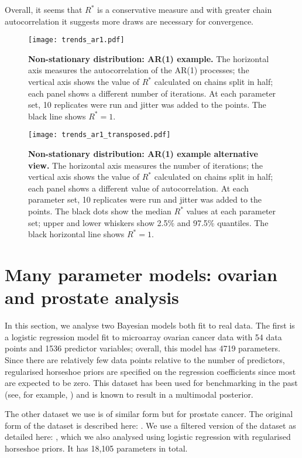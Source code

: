 \documentclass{article}
\begin{document}
Overall, it seems that $R^*$ is a conservative measure and with greater chain autocorrelation it suggests more draws are necessary for convergence.

\begin{figure}[!htb]
	\centerline{\texttt{[image: trends\_ar1.pdf]}}
	\caption{\textbf{Non-stationary distribution: AR(1) example.} The horizontal axis measures the autocorrelation of the AR(1) processes; the vertical axis shows the value of $R^*$ calculated on chains split in half; each panel shows a different number of iterations. At each parameter set, 10 replicates were run and jitter was added to the points. The black line shows $R^*=1$.}
	\label{fig:trends_ar1}
\end{figure}

\begin{figure}[!htb]
	\centerline{\texttt{[image: trends\_ar1\_transposed.pdf]}}
	\caption{\textbf{Non-stationary distribution: AR(1) example alternative view.} The horizontal axis measures the number of iterations; the vertical axis shows the value of $R^*$ calculated on chains split in half; each panel shows a different value of autocorrelation. At each parameter set, 10 replicates were run and jitter was added to the points. The black dots show the median $R^*$ values at each parameter set; upper and lower whiskers show 2.5\% and 97.5\% quantiles. The black horizontal line shows $R^*=1$. }
	\label{fig:trends_ar1_transposed}
\end{figure}

\section{Many parameter models: ovarian and prostate analysis}\label{sec:prostate}
In this section, we analyse two Bayesian models both fit to real data. The first is a logistic regression model fit to microarray ovarian cancer data with 54 data points and 1536 predictor variables; overall, this model has 4719 parameters. Since there are relatively few data points relative to the number of predictors, regularised horseshoe priors are specified on the regression coefficients \citep{piironen2017sparsity} since most are expected to be zero. This dataset has been used for benchmarking in the past (see, for example, \cite{schummer1999comparative,hernandez2010expectation,paananen2019implicitly}) and is known to result in a multimodal posterior.

The other dataset we use is of similar form but for prostate cancer. The original form of the dataset is described here: \cite{singh2002gene}. We use a filtered version of the dataset as detailed here: \cite{yang2006stable}, which we also analysed using logistic regression with regularised horseshoe priors. It has 18,105 parameters in total. 
\end{document}
